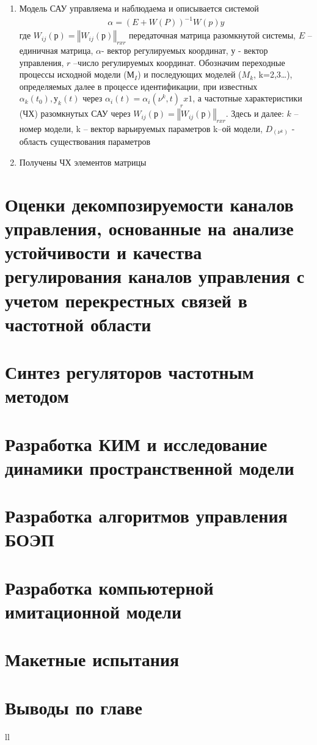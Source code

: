 \begin{enumerate}
	\item Модель САУ управляема и наблюдаема \cite[]{Bessekerski20} и описывается системой 
	\begin{equation}
	\label{eq:p2:8-}
	\begin{alignedat}{2}
	\alpha{}={\left(E+W(P)\right)}^{-1}W(p)y
	\end{alignedat}
	\end{equation}
	где $W_{ij}\left(р\right)={\left\Vert{}W_{ij}\left(р\right)\right\Vert{}}_{rxr}$	
	передаточная матрица разомкнутой системы, 
	$E$ – единичная матрица,
	$\alpha$- вектор регулируемых координат, 
	$у$ - вектор управления, 
	$r$ –число регулируемых координат. 
	Обозначим переходные процессы исходной модели ($М_I$) и последующих моделей ($M_k$, k=2,3…), определяемых далее в процессе идентификации, при известных $\alpha_k (t_0 ),у_k (t)$ через $\alpha_i (t)=\alpha_i (ν^k,t)_rx1$, а частотные характеристики (ЧХ) разомкнутых САУ через $W_{ij}\left(р\right)={\left\Vert{}W_{ij}\left(р\right)\right\Vert{}}_{rxr}$.  Здесь и далее: $k$ – номер  модели, k – вектор варьируемых параметров k–ой  модели, $D_(ν^k )$ - область существования параметров
	\item Получены ЧХ элементов матрицы
\end{enumerate}




\section{Оценки декомпозируемости каналов управления, основанные на анализе устойчивости и качества регулирования каналов управления с учетом перекрестных связей в частотной области} \label{sec:ch2/sec5}

\section{Синтез регуляторов частотным методом} \label{sec:ch2/sec6}

\section{Разработка КИМ и исследование динамики пространственной модели} \label{sec:ch2/sec7}

\section{Разработка алгоритмов управления БОЭП} \label{sec:ch2/sec8}

\section{Разработка компьютерной имитационной модели} \label{sec:ch2/sec9}

\section{Макетные испытания} \label{sec:ch2/sec10}

\section{Выводы по главе} \label{sec:ch2/sec11}



ll

